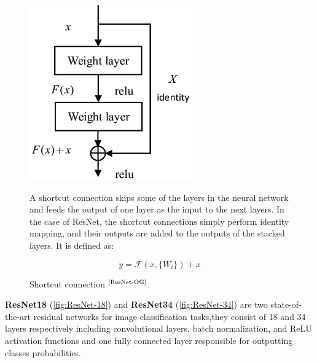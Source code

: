 \documentclass[
11pt, %
english, %
singlespacing, %
headsepline, %
]{project_structure}
\begin{document}
\begin{figure}[H]
    \begin{minipage}{0.4\textwidth}
        \centering
        \includegraphics[width=0.625\textwidth]{figures/background/shortcut-connection.png}
    \end{minipage}
    \hfill
    \begin{minipage}{0.55\textwidth}
        \noindent
        A shortcut connection skips some of the layers in the neural network and feeds the output of one layer as the input to the next layers. In the case of \acrshort{ResNet}, the shortcut connections simply perform identity mapping, and their outputs are added to the outputs of the stacked layers. It is defined as:

        $$
        y = \mathcal{F}(x, \{W_{i}\}) + x
        $$
    \end{minipage}
    \captionsetup{justification=raggedright,singlelinecheck=false}
        \caption{Shortcut connection $^{\text{\cite{ResNet-OG}}}$.}
        \label{fig:shortcut-connection}
\end{figure}

\noindent \textbf{\acrshort{ResNet}18} (\autoref{fig:ResNet-18}) and \textbf{\acrshort{ResNet}34} (\autoref{fig:ResNet-34}) are two state-of-the-art residual networks for image classification tasks,they consist of 18 and 34 layers respectively including convolutional layers, batch normalization, and ReLU activation functions and one fully connected layer responsible for outputting classes probabilities. 
\end{document}
